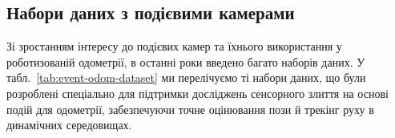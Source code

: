 

\subsection{Набори даних з подієвими камерами}\label{sec:dataset}
Зі зростанням інтересу до подієвих камер та їхнього використання у роботизованій одометрії, в останні роки введено багато наборів даних. У табл.~\ref{tab:event-odom-dataset} ми перелічуємо ті набори даних, що були розроблені спеціально для підтримки досліджень сенсорного злиття на основі подій для одометрії, забезпечуючи точне оцінювання пози й трекінг руху в динамічних середовищах.
